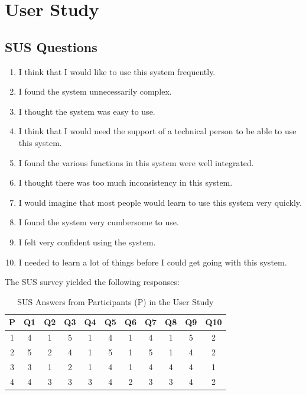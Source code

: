 \documentclass[sigconf,authordraft]{acmart}
\begin{document}
\newpage




\appendix

\section{User Study}
\subsection{SUS Questions}
\label{appendix:sus-questions}
\begin{enumerate}
    \item I think that I would like to use this system frequently.
    \item I found the system unnecessarily complex.
    \item I thought the system was easy to use.
    \item I think that I would need the support of a technical person to be able to use this system.
    \item I found the various functions in this system were well integrated.
    \item I thought there was too much inconsistency in this system.
    \item I would imagine that most people would learn to use this system very quickly.
    \item I found the system very cumbersome to use.
    \item I felt very confident using the system.
    \item I needed to learn a lot of things before I could get going with this system.
\end{enumerate}


The SUS survey yielded the following responses:
\begin{table}[h!]
    \centering
    \begin{tabular}{|c|c|c|c|c|c|c|c|c|c|c|}
    \hline
    \textbf{P} & \textbf{Q1} & \textbf{Q2} & \textbf{Q3} & \textbf{Q4} & \textbf{Q5} & \textbf{Q6} & \textbf{Q7} & \textbf{Q8} & \textbf{Q9} & \textbf{Q10} \\
    \hline
    1 & 4 & 1 & 5 & 1 & 4 & 1 & 4 & 1 & 5 & 2 \\
    2 & 5 & 2 & 4 & 1 & 5 & 1 & 5 & 1 & 4 & 2 \\
    3 & 3 & 1 & 2 & 1 & 4 & 1 & 4 & 4 & 4 & 1 \\
    4 & 4 & 3 & 3 & 3 & 4 & 2 & 3 & 3 & 4 & 2 \\
    \hline
    \end{tabular}
    \caption{SUS Answers from Participants (P) in the User Study}
    \label{tab:sus_scores}
\end{table}
\end{document}
